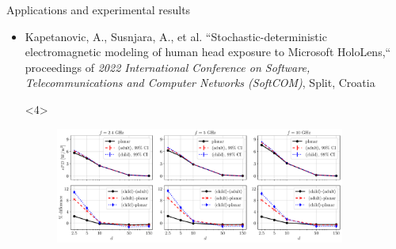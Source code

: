 \documentclass[xcolor=dvipsnames,10pt]{beamer}
\begin{document}
\begin{frame}{Applications and experimental results}
\begin{onlyenv}
\begin{itemize}
\begin{onlyenv}
\begin{figure}
                    \caption{Overview of the exposure scenario.}
                \end{figure}
            \end{onlyenv}
            \begin{onlyenv}<3>
                \begin{itemize}
                    \item assessment of the spatially averaged IPD on a spherical human head model at \SIrange{3.5}{100}{\GHz}
                    \item the spatially-averaged IPD defined either by averaging components of the power density vector normal to an valuation surface, or by averaging its norm
                    \item EM source -- a dipole antenna placed at a separation distance \SIrange{2}{150}{\mm} from the curved model and compared with differently positioned planar surfaces
                    \item appropriate settings of exposure -- IPD up to \SI{12}{\percent} greater for the surface-normal propagation-direction
                    \item the worst case scenario -- IPD up to  \SI{30}{\percent} larger regardless of definition
                    \item reactive near-field conditions -- norm definition of IPD $>$ normal defintion of IPD
                \end{itemize}
            \end{onlyenv}
            \item<only@4,5> Kapetanovic, A., Susnjara, A., et al. ``Stochastic-deterministic electromagnetic modeling of human head exposure to Microsoft HoloLens,`` proceedings of \textit{2022 International Conference on Software, Telecommunications and Computer Networks (SoftCOM)}, Split, Croatia
            \begin{onlyenv}<4>
                \begin{figure}
                    \centering
                    \includegraphics[width=0.9\textwidth]{figures/Kapetanovic2022SoftCOM.pdf}

\end{figure}
\end{onlyenv}
\end{itemize}
\end{onlyenv}
\end{frame}
\end{document}
